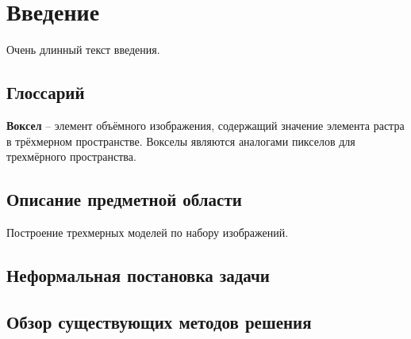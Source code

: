 \section{Введение}
Очень длинный текст введения.

\subsection{Глоссарий}
\textbf{Воксел} -- элемент объёмного изображения, содержащий значение элемента растра в трёхмерном пространстве. Вокселы являются аналогами пикселов для трехмёрного пространства.~\cite{wiki_voxel}

\subsection{Описание предметной области}
Построение трехмерных моделей по набору изображений.

\subsection{Неформальная постановка задачи}

\subsection{Обзор существующих методов решения}


